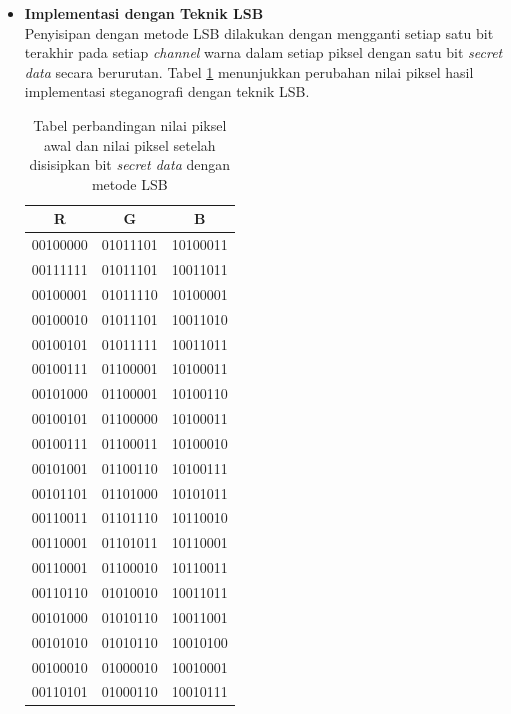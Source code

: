 \documentclass[a4paper,twoside]{article}
\begin{document}
\begin{enumerate}
		\begin{itemize}
		\item \textbf{Implementasi dengan Teknik LSB}\\
		Penyisipan dengan metode LSB dilakukan dengan mengganti setiap satu bit terakhir pada setiap \textit{channel} warna dalam setiap piksel dengan satu bit \textit{secret data} secara berurutan. Tabel \ref{TabelLSB} menunjukkan perubahan nilai piksel hasil implementasi steganografi dengan teknik LSB.\\
		
		\begin{table}[!htbp]				
		\centering		
		\caption{Tabel perbandingan nilai piksel awal dan nilai piksel setelah disisipkan bit \textit{secret data} dengan metode LSB}
		\label{TabelLSB}
		\begin{tabular}{| c | c | c |}
		\hline
		R & G & B\\
		\hline
		00100000 & 01011101 & 10100011\\
		\hline
		00111111 & 01011101 & 10011011\\
		\hline
		00100001 & 01011110 & 10100001\\
		\hline
		00100010 & 01011101 & 10011010\\
		\hline
		00100101 & 01011111 & 10011011\\
		\hline
		00100111 & 01100001 & 10100011\\
		\hline
		00101000 & 01100001 & 10100110\\
		\hline
		00100101 & 01100000 & 10100011\\
		\hline
		00100111 & 01100011 & 10100010\\
		\hline
		00101001 & 01100110 & 10100111\\
		\hline
		00101101 & 01101000 & 10101011\\
		\hline
		00110011 & 01101110 & 10110010\\
		\hline
		00110001 & 01101011 & 10110001\\
		\hline
		00110001 & 01100010 & 10110011\\
		\hline
		00110110 & 01010010 & 10011011\\
		\hline
		00101000 & 01010110 & 10011001\\
		\hline
		00101010 & 01010110 & 10010100\\
		\hline
		00100010 & 01000010 & 10010001\\
		\hline
		00110101 & 01000110 & 10010111\\
		\hline
		\end{tabular}
		\quad

\end{table}
\end{itemize}
\end{enumerate}
\end{document}
